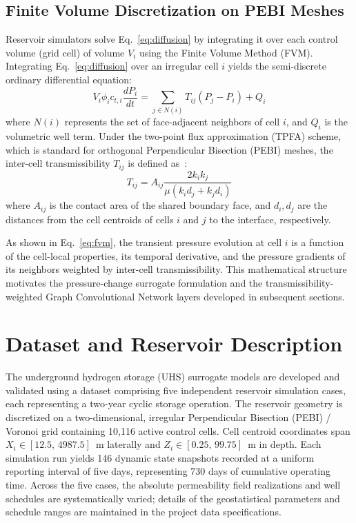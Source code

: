 \documentclass[10pt,twocolumn]{article}
\begin{document}
\subsection{Finite Volume Discretization on PEBI Meshes}
Reservoir simulators solve Eq.~\ref{eq:diffusion} by integrating it over each control volume (grid cell) of volume $V_i$ using the Finite Volume Method (FVM). Integrating Eq.~\ref{eq:diffusion} over an irregular cell $i$ yields the semi-discrete ordinary differential equation:
\begin{equation}
\label{eq:fvm}
V_i \phi_i c_{t,i} \frac{d P_i}{d t} = \sum_{j \in N(i)} T_{ij} (P_j - P_i) + Q_i
\end{equation}
where $N(i)$ represents the set of face-adjacent neighbors of cell $i$, and $Q_i$ is the volumetric well term. Under the two-point flux approximation (TPFA) scheme, which is standard for orthogonal Perpendicular Bisection (PEBI) meshes, the inter-cell transmissibility $T_{ij}$ is defined as~\cite{ahmed2015mpfa, pal2006tensor}:
\begin{equation}
\label{eq:trans}
T_{ij} = A_{ij} \frac{2 k_i k_j}{\mu (k_i d_j + k_j d_i)}
\end{equation}
where $A_{ij}$ is the contact area of the shared boundary face, and $d_i, d_j$ are the distances from the cell centroids of cells $i$ and $j$ to the interface, respectively. 

As shown in Eq.~\ref{eq:fvm}, the transient pressure evolution at cell $i$ is a function of the cell-local properties, its temporal derivative, and the pressure gradients of its neighbors weighted by inter-cell transmissibility. This mathematical structure motivates the pressure-change surrogate formulation and the transmissibility-weighted Graph Convolutional Network layers developed in subsequent sections.

\section{Dataset and Reservoir Description}
The underground hydrogen storage (UHS) surrogate models are developed and validated using a dataset comprising five independent reservoir simulation cases, each representing a two-year cyclic storage operation. The reservoir geometry is discretized on a two-dimensional, irregular Perpendicular Bisection (PEBI) / Voronoi grid containing 10,116 active control cells. Cell centroid coordinates span $X_i \in [12.5,\, 4987.5]$~m laterally and $Z_i \in [0.25,\, 99.75]$~m in depth. Each simulation run yields 146 dynamic state snapshots recorded at a uniform reporting interval of five days, representing 730 days of cumulative operating time. Across the five cases, the absolute permeability field realizations and well schedules are systematically varied; details of the geostatistical parameters and schedule ranges are maintained in the project data specifications.
\end{document}
